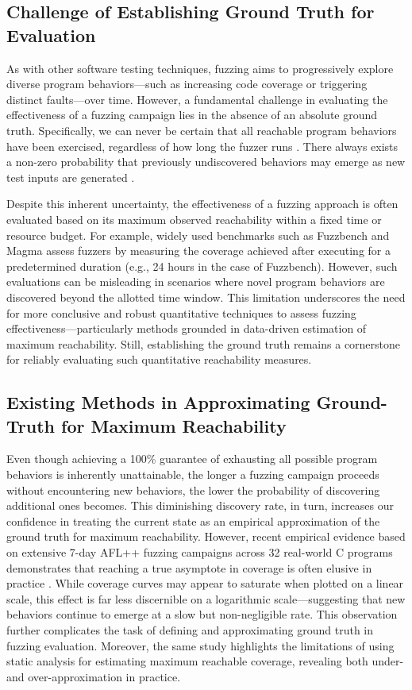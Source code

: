 \documentclass[conference]{IEEEtran}
\begin{document}
\subsection{Challenge of Establishing Ground Truth for Evaluation}

As with other software testing techniques, fuzzing aims to progressively explore diverse program behaviors—such as increasing code coverage or triggering distinct faults—over time. However, a fundamental challenge in evaluating the effectiveness of a fuzzing campaign lies in the absence of an absolute ground truth. Specifically, we can never be certain that all reachable program behaviors have been exercised, regardless of how long the fuzzer runs \cite{dijkstra2002ewd}. There always exists a non-zero probability that previously undiscovered behaviors may emerge as new test inputs are generated \cite{residual2021}.

Despite this inherent uncertainty, the effectiveness of a fuzzing approach is often evaluated based on its maximum observed reachability within a fixed time or resource budget. For example, widely used benchmarks such as Fuzzbench \cite{metzman2021fuzzbench} and Magma \cite{hazimeh2020magma} assess fuzzers by measuring the coverage achieved after executing for a predetermined duration (e.g., 24 hours in the case of Fuzzbench). However, such evaluations can be misleading in scenarios where novel program behaviors are discovered beyond the allotted time window. This limitation underscores the need for more conclusive and robust quantitative techniques to assess fuzzing effectiveness—particularly methods grounded in data-driven estimation of maximum reachability. Still, establishing the ground truth remains a cornerstone for reliably evaluating such quantitative reachability measures.

\subsection{Existing Methods in Approximating Ground-Truth for Maximum Reachability}

Even though achieving a 100\% guarantee of exhausting all possible program behaviors is inherently unattainable, the longer a fuzzing campaign proceeds without encountering new behaviors, the lower the probability of discovering additional ones becomes. This diminishing discovery rate, in turn, increases our confidence in treating the current state as an empirical approximation of the ground truth for maximum reachability. However, recent empirical evidence based on extensive 7-day AFL++ \cite{aflpp} fuzzing campaigns across 32 real-world C programs demonstrates that reaching a true asymptote in coverage is often elusive in practice \cite{reachability_2023}. While coverage curves may appear to saturate when plotted on a linear scale, this effect is far less discernible on a logarithmic scale—suggesting that new behaviors continue to emerge at a slow but non-negligible rate. This observation further complicates the task of defining and approximating ground truth in fuzzing evaluation. Moreover, the same study highlights the limitations of using static analysis for estimating maximum reachable coverage, revealing both under- and over-approximation in practice. 
\end{document}
